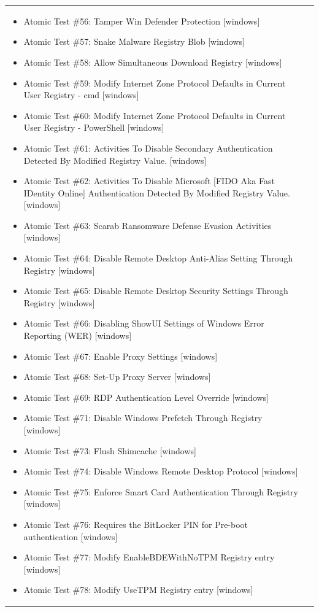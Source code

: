 \begin{longtable}{p{} p{}}
\begin{itemize}[leftmargin=*, nosep, topsep=0pt]
  \item Atomic Test \#56: Tamper Win Defender Protection [windows]
  \item Atomic Test \#57: Snake Malware Registry Blob [windows]
  \item Atomic Test \#58: Allow Simultaneous Download Registry [windows]
  \item Atomic Test \#59: Modify Internet Zone Protocol Defaults in Current User Registry - cmd [windows]
  \item Atomic Test \#60: Modify Internet Zone Protocol Defaults in Current User Registry - PowerShell [windows]
  \item Atomic Test \#61: Activities To Disable Secondary Authentication Detected By Modified Registry Value. [windows]
  \item Atomic Test \#62: Activities To Disable Microsoft [FIDO Aka Fast IDentity Online] Authentication Detected By Modified Registry Value. [windows]
  \item Atomic Test \#63: Scarab Ransomware Defense Evasion Activities [windows]
  \item Atomic Test \#64: Disable Remote Desktop Anti-Alias Setting Through Registry [windows]
  \item Atomic Test \#65: Disable Remote Desktop Security Settings Through Registry [windows]
  \item Atomic Test \#66: Disabling ShowUI Settings of Windows Error Reporting (WER) [windows]
  \item Atomic Test \#67: Enable Proxy Settings [windows]
  \item Atomic Test \#68: Set-Up Proxy Server [windows]
  \item Atomic Test \#69: RDP Authentication Level Override [windows]
  \item Atomic Test \#71: Disable Windows Prefetch Through Registry [windows]
  \item Atomic Test \#73: Flush Shimcache [windows]
  \item Atomic Test \#74: Disable Windows Remote Desktop Protocol [windows]
  \item Atomic Test \#75: Enforce Smart Card Authentication Through Registry [windows]
  \item Atomic Test \#76: Requires the BitLocker PIN for Pre-boot authentication [windows]
  \item Atomic Test \#77: Modify EnableBDEWithNoTPM Registry entry [windows]
  \item Atomic Test \#78: Modify UseTPM Registry entry [windows]

\end{itemize}
\end{longtable}
